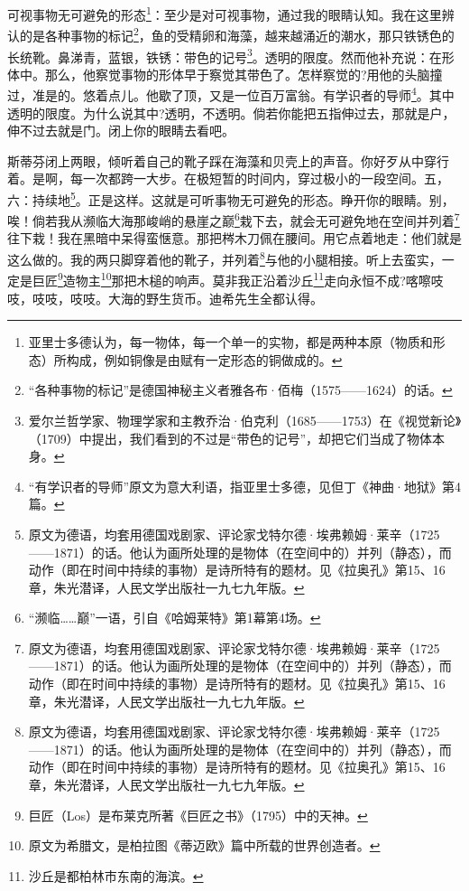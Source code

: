\par 可视事物无可避免的形态\footnote{亚里士多德认为，每一物体，每一个单一的实物，都是两种本原（物质和形态）所构成，例如铜像是由赋有一定形态的铜做成的。}：至少是对可视事物，通过我的眼睛认知。我在这里辨认的是各种事物的标记\footnote{“各种事物的标记”是德国神秘主义者雅各布·佰梅（1575——1624）的话。}，鱼的受精卵和海藻，越来越涌近的潮水，那只铁锈色的长统靴。鼻涕青，蓝银，铁锈：带色的记号\footnote{爱尔兰哲学家、物理学家和主教乔治·伯克利（1685——1753）在《视觉新论》（1709）中提出，我们看到的不过是“带色的记号”，却把它们当成了物体本身。}。透明的限度。然而他补充说：在形体中。那么，他察觉事物的形体早于察觉其带色了。怎样察觉的?用他的头脑撞过，准是的。悠着点儿。他歇了顶，又是一位百万富翁。有学识者的导师\footnote{“有学识者的导师”原文为意大利语，指亚里士多德，见但丁《神曲·地狱》第4篇。}。其中透明的限度。为什么说其中?透明，不透明。倘若你能把五指伸过去，那就是户，伸不过去就是门。闭上你的眼睛去看吧。
\par 斯蒂芬闭上两眼，倾听着自己的靴子踩在海藻和贝壳上的声音。你好歹从中穿行着。是啊，每一次都跨一大步。在极短暂的时间内，穿过极小的一段空间。五，六：持续地\footnote{原文为德语，均套用德国戏剧家、评论家戈特尔德·埃弗赖姆·莱辛（1725——1871）的话。他认为画所处理的是物体（在空间中的）并列（静态），而动作（即在时间中持续的事物）是诗所特有的题材。见《拉奥孔》第15、16章，朱光潜译，人民文学出版社一九七九年版。}。正是这样。这就是可听事物无可避免的形态。睁开你的眼睛。别，唉！倘若我从濒临大海那峻峭的悬崖之巅\footnote{“濒临……巅”一语，引自《哈姆莱特》第1幕第4场。}栽下去，就会无可避免地在空间并列着\footnote{原文为德语，均套用德国戏剧家、评论家戈特尔德·埃弗赖姆·莱辛（1725——1871）的话。他认为画所处理的是物体（在空间中的）并列（静态），而动作（即在时间中持续的事物）是诗所特有的题材。见《拉奥孔》第15、16章，朱光潜译，人民文学出版社一九七九年版。}往下栽！我在黑暗中呆得蛮惬意。那把梣木刀佩在腰间。用它点着地走：他们就是这么做的。我的两只脚穿着他的靴子，并列着\footnote{原文为德语，均套用德国戏剧家、评论家戈特尔德·埃弗赖姆·莱辛（1725——1871）的话。他认为画所处理的是物体（在空间中的）并列（静态），而动作（即在时间中持续的事物）是诗所特有的题材。见《拉奥孔》第15、16章，朱光潜译，人民文学出版社一九七九年版。}与他的小腿相接。听上去蛮实，一定是巨匠\footnote{巨匠（Los）是布莱克所著《巨匠之书》（1795）中的天神。}造物主\footnote{原文为希腊文，是柏拉图《蒂迈欧》篇中所载的世界创造者。}那把木槌的响声。莫非我正沿着沙丘\footnote{沙丘是都柏林市东南的海滨。}走向永恒不成?喀嚓吱吱，吱吱，吱吱。大海的野生货币。迪希先生全都认得。
